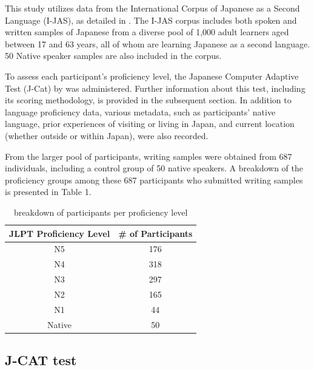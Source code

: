 This study utilizes data from the International Corpus of Japanese as a Second Language (I-JAS), as detailed in \citet{Sakoda2020}.  The I-JAS corpus includes both spoken and written samples of Japanese from a diverse pool of 1,000 adult learners aged between 17 and 63 years, all of whom are learning Japanese as a second language. 50 Native speaker samples are also included in the corpus.

To assess each participant's proficiency level, the Japanese Computer Adaptive Test (J-Cat) by \citet{Imai2009} was administered. Further information about this test, including its scoring methodology, is provided in the subsequent section. In addition to language proficiency data, various metadata, such as participants' native language, prior experiences of visiting or living in Japan, and current location (whether outside or within Japan), were also recorded.

From the larger pool of participants, writing samples were obtained from 687 individuals, including a control group
of 50 native speakers. A breakdown of the proficiency groups among these 687 participants who submitted writing
samples is presented in Table 1.



\begin{table}
\centering
\begin{tabular}{cc}
\hline \textbf{JLPT Proficiency Level} & \textbf{\# of Participants} \\ \hline
N5 & 176 \\
N4  & 318 \\
N3 & 297\\
N2 & 165 \\
N1 & 44 \\
Native & 50 \\
\hline
\end{tabular}
\caption{\label{participants-chart} breakdown of participants per proficiency level}
\end{table}


\subsection{J-CAT test}

